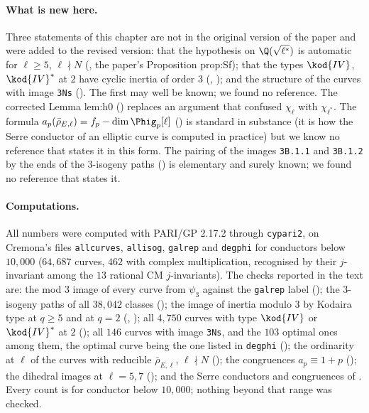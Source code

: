 \paragraph{What is new here.} Three statements of this chapter are not in the original version of the paper and were added to the revised
version: that the hypothesis on $\Q(\sqrt{\ell^*})$ is automatic for $\ell\ge5$, $\ell\nmid N$ (, the paper's Proposition prop:Sf);
that the types $\kod{IV}$, $\kod{IV}^*$ at $2$ have cyclic inertia of order $3$ (, ); and the structure of the curves
with image \texttt{3Ns} (). The first may well be known; we found no reference. The corrected Lemma lem:h0
() replaces an argument that confused $\chi_\ell$ with $\chi_{\ell^*}$. The formula $a_p(\bar\rho_{E,\ell})=f_p-\dim\Phig_p[\ell]$
() is standard in substance (it is how the Serre conductor of an elliptic curve is computed in practice) but we
know no reference that states it in this form. The pairing of the images \texttt{3B.1.1} and \texttt{3B.1.2} by the ends of the $3$-isogeny paths
() is elementary and surely known; we found no reference that states it.

\paragraph{Computations.} All numbers were computed with PARI/GP 2.17.2 \cite{PARI} through \texttt{cypari2}, on Cremona's files \texttt{allcurves},
\texttt{allisog}, \texttt{galrep} and \texttt{degphi} \cite{ecdata} for conductors below $10{,}000$ ($64{,}687$ curves, $462$ with complex multiplication, recognised
by their $j$-invariant among the $13$ rational CM $j$-invariants). The checks reported in
the text are: the mod $3$ image of every curve from $\psi_3$ against the \texttt{galrep} label (); the $3$-isogeny paths of all
$38{,}042$ classes (); the image of inertia modulo $3$
by Kodaira type at $q\ge5$ and at $q=2$ (, ); all $4{,}750$ curves with type $\kod{IV}$ or $\kod{IV}^*$ at $2$
(); all $146$ curves with image \texttt{3Ns}, and the $103$ optimal ones among them, the optimal curve being the one listed in \texttt{degphi}
(); the ordinarity at $\ell$ of the curves with reducible
$\bar\rho_{E,\ell}$, $\ell\nmid N$ (); the congruences $a_p\equiv1+p$ (); the dihedral images at $\ell=5,7$
(); and the Serre conductors and congruences of . Every count is for conductor below
$10{,}000$; nothing beyond that range was checked.
